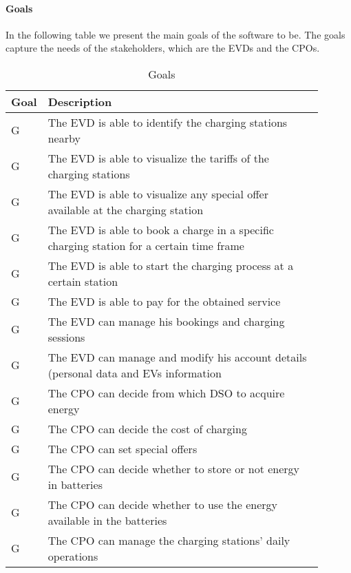 \paragraph{Goals} In the following table we present the main goals of the software to be. The goals capture the needs of the stakeholders, which are the EVDs and the CPOs.

\setcounter{gc}{1}
\newcommand{\gcnt}{\thegc\stepcounter{gc}}
\begin{table}[H]
    \centering
    \begin{tabular}{|l|p{0.9\linewidth}|}
     \hline
     \textbf{Goal} & \textbf{Description} \\
     \hline
     G\gcnt & The EVD is able to identify the charging stations nearby \\
     \hline
     G\gcnt & The EVD is able to visualize the tariffs of the charging stations \\
     \hline
     G\gcnt & The EVD is able to visualize any special offer available at the charging station \\
     \hline
     G\gcnt & The EVD is able to book a charge in a specific charging station for a certain time frame\\
     \hline
     G\gcnt & The EVD is able to start the charging process at a certain station \\
     \hline
     G\gcnt & The EVD is able to pay for the obtained service \\
     \hline
     G\gcnt & The EVD can manage his bookings and charging sessions \\
     \hline
     G\gcnt & The EVD can manage and modify his account details (personal data and EVs information \\
     \hline
     G\gcnt & The CPO can decide from which DSO to acquire energy \\
     \hline 
     G\gcnt & The CPO can decide the cost of charging \\
     \hline 
     G\gcnt & The CPO can set special offers \\
     \hline 
     G\gcnt & The CPO can decide whether to store or not energy in batteries \\
     \hline 
     G\gcnt & The CPO can decide whether to use the energy available in the batteries \\
     \hline 
     G\gcnt & The CPO can manage the charging stations' daily operations\\
     \hline
\end{tabular}
    \caption{Goals}
    \label{tab:Goals}
\end{table}

